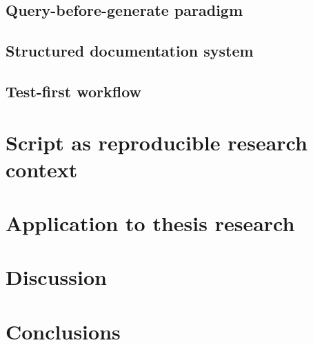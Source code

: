 \documentclass[../main]{subfiles}
\begin{document}
\subsection{Query-before-generate paradigm}
\subsection{Structured documentation system}
\subsection{Test-first workflow}

\section{Script as reproducible research context}
\label{sec:ai_scripts}

\section{Application to thesis research}
\label{sec:ai_application}

\section{Discussion}
\label{sec:ai_discussion}

\section{Conclusions}
\label{sec:ai_conclusions}
\end{document}
